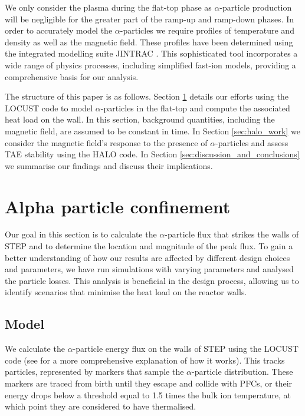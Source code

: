 \documentclass[10pt, a4paper, twoside]{article}
\begin{document}
We only consider the plasma during the flat-top phase as $\alpha$-particle production will be negligible for the greater part of the ramp-up and ramp-down phases. In order to accurately model the $\alpha$-particles we require profiles of temperature and density as well as the magnetic field. These profiles have been determined using the integrated modelling suite JINTRAC \cite{meyer2023, mitchell2023}. This sophisticated tool incorporates a wide range of physics processes, including simplified fast-ion models, providing a comprehensive basis for our analysis.

The structure of this paper is as follows. Section \ref{sec:locust_work} details our efforts using the LOCUST code to model $\alpha$-particles in the flat-top and compute the associated heat load on the wall. In this section, background quantities, including the magnetic field, are assumed to be constant in time. In Section \ref{sec:halo_work} we consider the magnetic field's response to the presence of $\alpha$-particles and assess TAE stability using the HALO code. In Section \ref{sec:discussion_and_conclusions} we summarise our findings and discuss their implications.

\section{Alpha particle confinement}
\label{sec:locust_work}

Our goal in this section is to calculate the $\alpha$-particle flux that strikes the walls of STEP and to determine the location and magnitude of the peak flux. To gain a better understanding of how our results are affected by different design choices and parameters, we have run simulations with varying parameters and analysed the particle losses. This analysis is beneficial in the design process, allowing us to identify scenarios that minimise the heat load on the reactor walls.

\subsection{Model}
\label{sec:model}

We calculate the $\alpha$-particle energy flux on the walls of STEP using the LOCUST code (see \cite{akers2018, ward2021} for a more comprehensive explanation of how it works). This tracks particles, represented by markers that sample the $\alpha$-particle distribution. These markers are traced from birth until they escape and collide with PFCs, or their energy drops below a threshold equal to 1.5 times the bulk ion temperature, at which point they are considered to have thermalised. 
\end{document}
